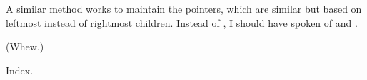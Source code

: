 A similar method works to maintain the  pointers, which are
similar but based on leftmost instead of rightmost children. Instead
of , I should have spoken of  and
.

(Whew.)

\fi

Index.
\fi

\inx
\fin
\con
